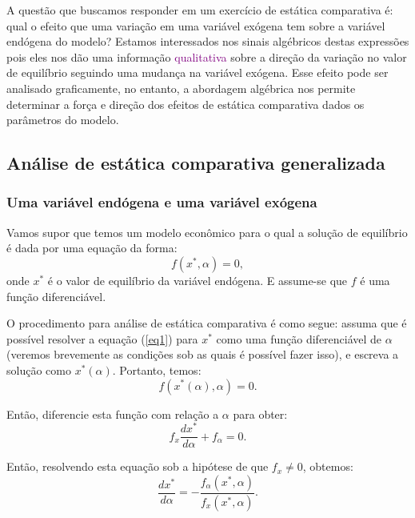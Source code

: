 \documentclass[12pt]{article}
\begin{document}
A questão que buscamos responder em um exercício de estática comparativa é: qual o efeito que uma variação em uma variável exógena tem sobre a variável endógena do modelo? Estamos interessados nos sinais algébricos destas expressões pois eles nos dão uma informação \textcolor{purple}{qualitativa} sobre a direção da variação no valor de equilíbrio seguindo uma mudança na variável exógena. Esse efeito pode ser analisado graficamente, no entanto, a abordagem algébrica nos permite determinar a força e direção dos efeitos de estática comparativa dados os parâmetros do modelo.

\subsection{Análise de estática comparativa generalizada}

\subsubsection{Uma variável endógena e uma variável exógena}

Vamos supor que temos um modelo econômico para o qual a solução de equilíbrio é dada por uma equação da forma:
\begin{equation}
    f(x^*, \alpha) = 0,
    \label{eq1}
\end{equation}
onde $x^*$ é o valor de equilíbrio da variável endógena. E assume-se que $f$ é uma função diferenciável.

O procedimento para análise de estática comparativa é como segue: assuma que é possível resolver a equação (\ref{eq1}) para $x^*$ como uma função diferenciável de $\alpha$ (veremos brevemente as condições sob as quais é possível fazer isso), e escreva a solução como $x^*(\alpha)$. Portanto, temos:
\begin{equation}
    f(x^*(\alpha), \alpha) = 0.
    \label{eq2}
\end{equation}

Então, diferencie esta função com relação a $\alpha$ para obter:
\begin{equation}
    f_x \frac{dx^*}{d\alpha} + f_\alpha = 0.
\end{equation}

Então, resolvendo esta equação sob a hipótese de que $f_x \neq 0$, obtemos:
\begin{equation}
    \frac{dx^*}{d\alpha} = -\frac{f_\alpha(x^*,\alpha)}{f_x(x^*,\alpha)}.
\end{equation}
\end{document}
